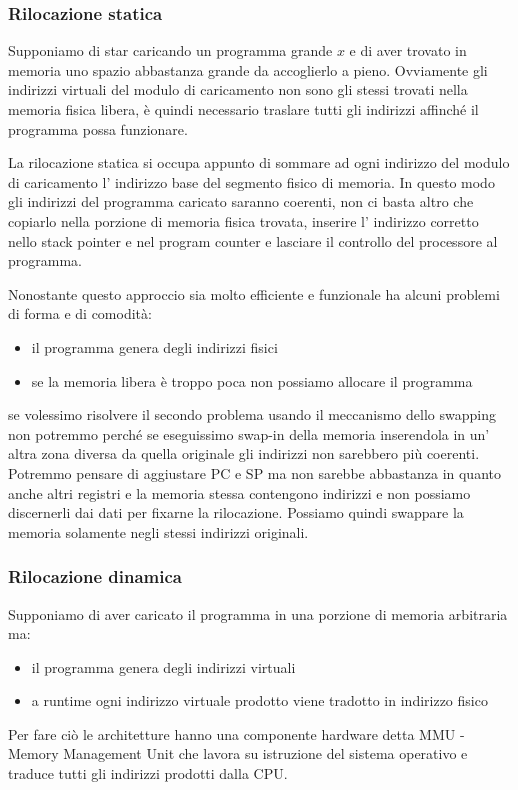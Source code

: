 \subsubsection{Rilocazione statica}
Supponiamo di star caricando un programma grande $x$ e di aver trovato in memoria uno spazio abbastanza grande da accoglierlo a pieno.
Ovviamente gli indirizzi virtuali del modulo di caricamento non sono gli stessi trovati nella memoria fisica libera, è quindi necessario traslare tutti gli indirizzi affinché il programma possa funzionare.

La rilocazione statica si occupa appunto di sommare ad ogni indirizzo del modulo di caricamento l' indirizzo base del segmento fisico di memoria.
In questo modo gli indirizzi del programma caricato saranno coerenti, non ci basta altro che copiarlo nella porzione di memoria fisica trovata, inserire l' indirizzo corretto nello stack pointer e nel program counter e lasciare il controllo del processore al programma.

Nonostante questo approccio sia molto efficiente e funzionale ha alcuni problemi di forma e di comodità:
\begin{itemize}
    \item il programma genera degli indirizzi fisici
    \item se la memoria libera è troppo poca non possiamo allocare il programma
\end{itemize}
se volessimo risolvere il secondo problema usando il meccanismo dello swapping non potremmo perché se eseguissimo swap-in della memoria inserendola in un' altra zona diversa da quella originale gli indirizzi non sarebbero più coerenti.
Potremmo pensare di aggiustare PC e SP ma non sarebbe abbastanza in quanto anche altri registri e la memoria stessa contengono indirizzi e non possiamo discernerli dai dati per fixarne la rilocazione.
Possiamo quindi swappare la memoria solamente negli stessi indirizzi originali. 


\subsubsection{Rilocazione dinamica}
Supponiamo di aver caricato il programma in una porzione di memoria arbitraria ma:
\begin{itemize}
    \item il programma genera degli indirizzi virtuali
    \item a runtime ogni indirizzo virtuale prodotto viene tradotto in indirizzo fisico
\end{itemize}
Per fare ciò le architetture hanno una componente hardware detta MMU - Memory Management Unit che lavora su istruzione del sistema operativo e traduce tutti gli indirizzi prodotti dalla CPU.

